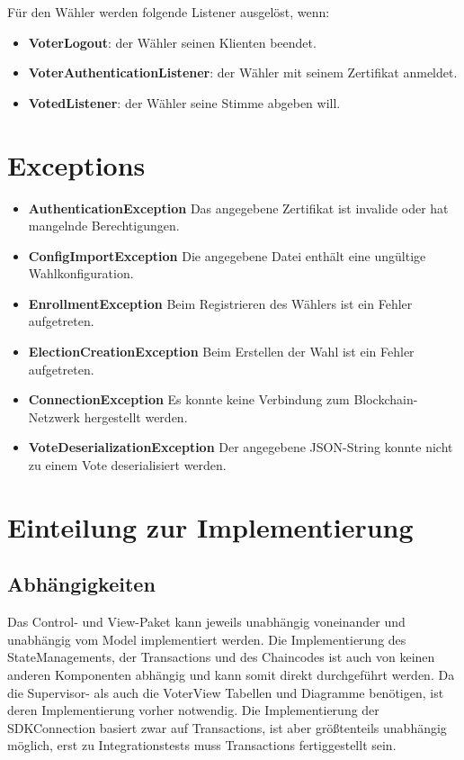 \documentclass[parskip=full]{scrartcl}
\newcommand{\fakeparagraph}[1]{\textbf{#1}}
\begin{document}
	Für den Wähler werden folgende Listener ausgelöst, wenn:
	\begin{itemize}
		\item\fakeparagraph{VoterLogout}: der Wähler seinen Klienten beendet.
		\item\fakeparagraph{VoterAuthenticationListener}: der Wähler mit seinem Zertifikat anmeldet.
		\item\fakeparagraph{VotedListener}: der Wähler seine Stimme abgeben will.
	\end{itemize}

   \section{Exceptions}
   	\begin{itemize}
   		\item\fakeparagraph{AuthenticationException} Das angegebene Zertifikat ist invalide oder hat mangelnde Berechtigungen.
   		\item\fakeparagraph{ConfigImportException} Die angegebene Datei enthält eine ungültige Wahlkonfiguration.
   		\item\fakeparagraph{EnrollmentException} Beim Registrieren des Wählers ist ein Fehler aufgetreten.
   		\item\fakeparagraph{ElectionCreationException} Beim Erstellen der Wahl ist ein Fehler aufgetreten.
   		\item\fakeparagraph{ConnectionException} Es konnte keine Verbindung zum Blockchain-Netzwerk hergestellt werden.
   		\item\fakeparagraph{VoteDeserializationException} Der angegebene JSON-String konnte nicht zu einem Vote deserialisiert werden.
   	\end{itemize}
  
  	\section{Einteilung zur Implementierung}
  	\subsection{Abhängigkeiten}
  	Das Control- und View-Paket kann jeweils unabhängig voneinander und unabhängig vom Model implementiert werden. Die Implementierung des StateManagements, der Transactions und des Chaincodes ist auch von keinen anderen Komponenten abhängig und kann somit direkt durchgeführt werden. Da die Supervisor- als auch die VoterView Tabellen und Diagramme benötigen, ist deren Implementierung vorher notwendig. Die Implementierung der SDKConnection basiert zwar auf Transactions, ist aber größtenteils unabhängig möglich, erst zu Integrationstests muss Transactions fertiggestellt sein.
  	
\end{document}
